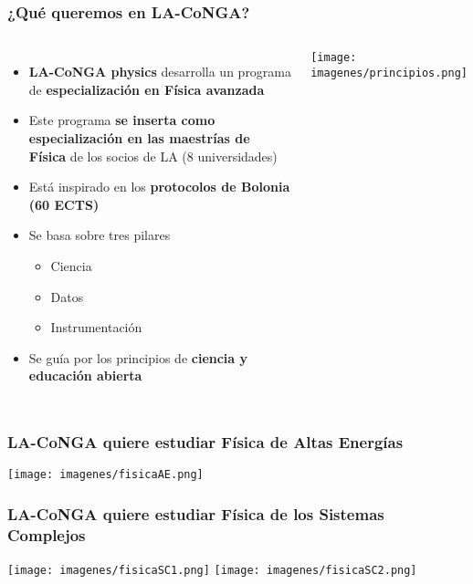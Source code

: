 \begin{frame}[fragile]
\frametitle{¿Qué queremos en LA-CoNGA?}
\begin{columns}[c] %


\begin{itemize}
	\item {\bf \color{LCredInst} LA-CoNGA physics} desarrolla un programa de {\bf  \color{LCblueInst} especialización en Física avanzada} 
	\item Este programa {\bf  \color{logoyellow} se inserta como especialización en las maestrías de Física} de los socios de LA (8 universidades)
	\item Está inspirado en los {\bf  \color{logobrownD} protocolos de Bolonia (60 ECTS)}
	\item Se basa sobre tres pilares
	\begin{itemize}
		\item Ciencia
		\item Datos
		\item Instrumentación
		\end{itemize}
	\item Se guía por los principios de {\bf  \color{LCblueSec1} ciencia y educación abierta}
\end{itemize}


\begin{center}
\texttt{[image: imagenes/principios.png]}
\end{center}

\end{columns}


\end{frame}

\begin{frame}[fragile]
\frametitle{LA-CoNGA quiere estudiar Física de Altas Energías}
\begin{center}
\texttt{[image: imagenes/fisicaAE.png]}
\end{center}
\end{frame}


\begin{frame}[fragile]
\frametitle{LA-CoNGA quiere estudiar Física de los Sistemas Complejos}
\begin{center}
\texttt{[image: imagenes/fisicaSC1.png]}
\texttt{[image: imagenes/fisicaSC2.png]}
\end{center}
\end{frame}


